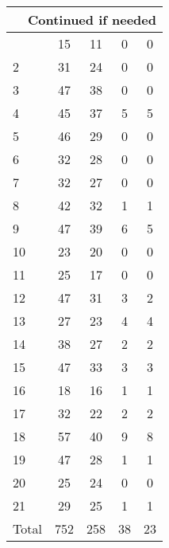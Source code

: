 \begin{center}
\begin{longtable}{l|c|c|c|c}
\hline \multicolumn{5}{|r|}{{Continued if needed}} \\ \hline
\endfoot 
1 & 15 & 11 & 0 & 0\\ \hline
2 & 31 & 24 & 0 & 0\\ \hline
3 & 47 & 38 & 0 & 0\\ \hline
4 & 45 & 37 & 5 & 5\\ \hline
5 & 46 & 29 & 0 & 0\\ \hline
6 & 32 & 28 & 0 & 0\\ \hline
7 & 32 & 27 & 0 & 0\\ \hline
8 & 42 & 32 & 1 & 1\\ \hline
9 & 47 & 39 & 6 & 5\\ \hline
10 & 23 & 20 & 0 & 0\\ \hline
11 & 25 & 17 & 0 & 0\\ \hline
12 & 47 & 31 & 3 & 2\\ \hline
13 & 27 & 23 & 4 & 4\\ \hline
14 & 38 & 27 & 2 & 2\\ \hline
15 & 47 & 33 & 3 & 3\\ \hline
16 & 18 & 16 & 1 & 1\\ \hline
17 & 32 & 22 & 2 & 2\\ \hline
18 & 57 & 40 & 9 & 8\\ \hline
19 & 47 & 28 & 1 & 1\\ \hline
20 & 25 & 24 & 0 & 0\\ \hline
21 & 29 & 25 & 1 & 1\\ \hline
\hline \hline
Total & 752 & 258 & 38 & 23



\end{longtable}
\end{center}

 

